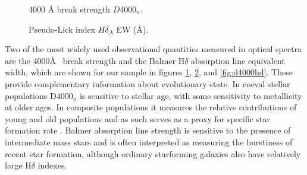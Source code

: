 \documentclass[modern]{aastex62}
\begin{document}
\begin{figure}[ht]
\centering
{}
\caption{4000 {\AA} break strength $D4000_n$.}
\label{fig:d4000maps}
\end{figure}

\begin{figure}[ht]
\centering
{}
\caption{Pseudo-Lick index $H\delta_A$ EW ({\AA}).}
\label{fig:hdeltamaps}
\end{figure}

Two of the most widely used observational quantities measured in optical spectra are the 4000\AA~ break strength and the Balmer H$\delta$ absorption line equivalent width, which are shown for our sample in figures \ref{fig:d4000maps}, \ref{fig:hdeltamaps}, and \ref{fig:d4000hd}. These provide complementary information about evolutionary state. In coeval stellar populations D$4000_n$ is sensitive to stellar age, with some sensitivity to metallicity at older ages. In composite populations it measures the relative contributions of young and old populations and as such serves as a proxy for specific star formation rate \citep{2004MNRAS.351.1151B}. Balmer absorption line strength is sensitive to the presence of intermediate mass stars and is often interpreted as measuring the burstiness of recent star formation, although ordinary starforming galaxies also have relatively large H$\delta$ indexes.
\end{document}
